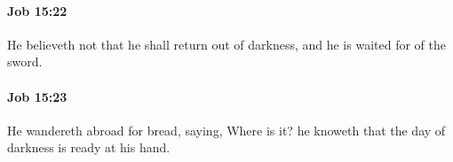 		\paragraph{Job 15:22} %
			\label{JOB-15-22}

			He believeth not that he shall return out of darkness, and he is waited for of the sword.


		\paragraph{Job 15:23} %
			\label{JOB-15-23}

			He wandereth abroad for bread, saying, Where is it? he knoweth that the day of darkness is ready at his hand.


